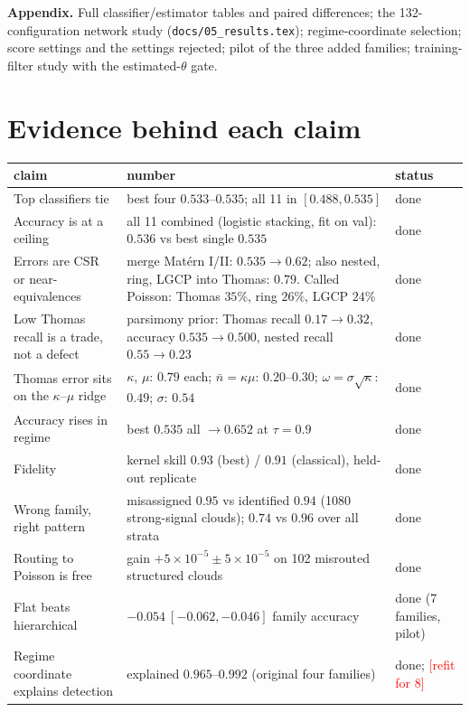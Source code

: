\documentclass[11pt]{article}
\newcommand{\nb}{\bar n}
\newcommand{\pending}[1]{\textcolor{red}{[#1]}}
\newcommand{\src}[1]{{\footnotesize\texttt{#1}}}
\begin{document}
\textbf{Appendix.} Full classifier/estimator tables and paired differences; the 132-configuration network study
(\src{docs/05\_results.tex}); regime-coordinate selection; score settings and the settings rejected; pilot of the three
added families; training-filter study with the estimated-$\theta$ gate.

\section*{Evidence behind each claim}

{\small
\begin{tabularx}{\linewidth}{@{}Xp{5.4cm}p{2.1cm}@{}}
\toprule
claim & number & status \\
\midrule
Top classifiers tie & best four $0.533$--$0.535$; all 11 in $[0.488,0.535]$ & done \\
Accuracy is at a ceiling & all 11 combined (logistic stacking, fit on val): $0.536$ vs best single $0.535$ & done \\
Errors are CSR or near-equivalences & merge Mat\'ern I/II: $0.535\to0.62$; also nested, ring, LGCP into Thomas: $0.79$.
  Called Poisson: Thomas $35\%$, ring $26\%$, LGCP $24\%$ & done \\
Low Thomas recall is a trade, not a defect & parsimony prior: Thomas recall $0.17\to0.32$, accuracy $0.535\to0.500$,
  nested recall $0.55\to0.23$ & done \\
Thomas error sits on the $\kappa$--$\mu$ ridge & $\kappa$, $\mu$: $0.79$ each; $\nb=\kappa\mu$: $0.20$--$0.30$;
  $\omega=\sigma\sqrt\kappa$: $0.49$; $\sigma$: $0.54$ & done \\
Accuracy rises in regime & best $0.535$ all $\to0.652$ at $\tau=0.9$ & done \\
Fidelity & kernel skill $0.93$ (best) / $0.91$ (classical), held-out replicate & done \\
Wrong family, right pattern & misassigned $0.95$ vs identified $0.94$ (1080 strong-signal clouds);
  $0.74$ vs $0.96$ over all strata & done \\
Routing to Poisson is free & gain $+5{\times}10^{-5}\pm5{\times}10^{-5}$ on 102 misrouted structured clouds & done \\
Flat beats hierarchical & $-0.054\ [-0.062,-0.046]$ family accuracy & done (7 families, pilot) \\
Regime coordinate explains detection & explained $0.965$--$0.992$ (original four families) & done; \pending{refit for 8} \\

\end{tabularx}}
\end{document}
